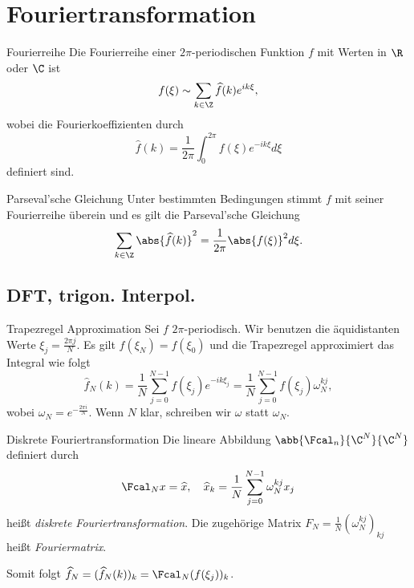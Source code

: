 \section{Fouriertransformation}

\begin{karte}{Fourierreihe}
    Die Fourierreihe einer \( 2\pi \)-periodischen Funktion \(f\) 
    mit Werten in \(\R\) oder \(\C\) ist 
    \[ f(\xi) \sim \sum_{k\in\Z} \widehat{f}(k) e^{ik\xi}, \]
    wobei die Fourierkoeffizienten durch 
    \[ \widehat{f}(k) = \frac{1}{2\pi} \int_0^{2\pi} f(\xi) e^{-ik\xi} d\xi \]
    definiert sind.
\end{karte}

\begin{karte}{Parseval'sche Gleichung}
    Unter bestimmten Bedingungen stimmt \(f\) mit seiner Fourierreihe überein 
    und es gilt die Parseval'sche Gleichung
    \[ \sum_{k\in\Z} \abs{\widehat{f}(k)}^2 = \frac{1}{2\pi} \abs{f(\xi)}^2 d\xi. \]
\end{karte}

\subsection{DFT, trigon. Interpol.}

\begin{karte}{Trapezregel Approximation}
    Sei \(f\) \(2\pi\)-periodisch. Wir benutzen die äquidistanten Werte 
    \( \xi_j = \frac{2\pi j}{N} \). Es gilt \( f(\xi_N) = f(\xi_0) \)
    und die Trapezregel approximiert das Integral wie folgt 
    \[ \widehat{f}_N(k) = \frac{1}{N} \sum_{j=0}^{N-1} f(\xi_j) e^{-ik\xi_j} 
    = \frac{1}{N} \sum_{j=0}^{N-1} f(\xi_j) \omega_N^{kj}, \]
    wobei \( \omega_N = e^{-\frac{2\pi i}{N}} \). Wenn \(N\) klar, 
    schreiben wir \(\omega\) statt \(\omega_N\). 
\end{karte}

\begin{karte}{Diskrete Fouriertransformation}
    Die lineare Abbildung \( \abb{\Fcal_n}{\C^N}{\C^N} \)
    definiert durch 
    \[ \Fcal_N x = \widehat{x}, \quad 
    \widehat{x}_k = \frac{1}{N} \sum_{j=0}^{N-1} \omega_N^{kj} x_j \]
    heißt \textit{diskrete Fouriertransformation}. 
    Die zugehörige Matrix \( F_N = \frac{1}{N} (\omega_N^{kj})_{kj} \) 
    heißt \textit{Fouriermatrix}.

    Somit folgt \( \widehat{f}_N = (\widehat{f}_N(k))_k = \Fcal_N(f(\xi_j))_k \).
\end{karte}

